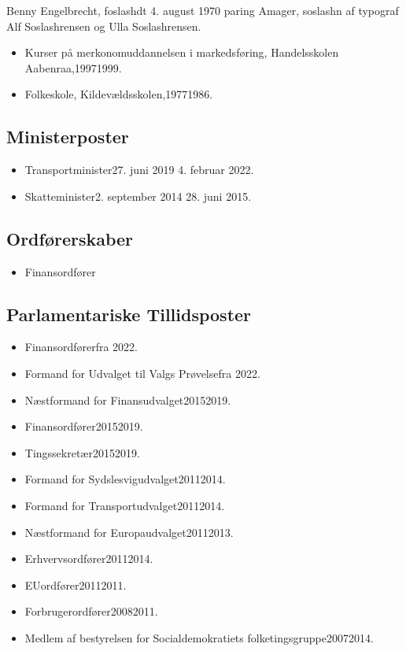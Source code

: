 \documentclass[11pt, a4paper]{awesome-cv}
\begin{document}
\makecvheader[R]
\makelettertitle
\begin{cvletter}
Benny Engelbrecht, foslashdt 4. august 1970 paring Amager, soslashn af typograf Alf Soslashrensen og Ulla Soslashrensen.

\begin{itemize}
\item Kurser på merkonomuddannelsen i markedsføring, Handelsskolen Aabenraa,19971999.
\item Folkeskole, Kildevældsskolen,19771986.
\end{itemize}
\subsection*{Ministerposter}
\begin{itemize}
\item Transportminister27. juni 2019  4. februar 2022.
\item Skatteminister2. september 2014  28. juni 2015.
\end{itemize}
\subsection*{Ordførerskaber}
\begin{itemize}
\item Finansordfører
\end{itemize}
\subsection*{Parlamentariske Tillidsposter}
\begin{itemize}
\item Finansordførerfra 2022.
\item Formand for Udvalget til Valgs Prøvelsefra 2022.
\item Næstformand for Finansudvalget20152019.
\item Finansordfører20152019.
\item Tingssekretær20152019.
\item Formand for Sydslesvigudvalget20112014.
\item Formand for Transportudvalget20112014.
\item Næstformand for Europaudvalget20112013.
\item Erhvervsordfører20112014.
\item EUordfører20112011.
\item Forbrugerordfører20082011.
\item Medlem af bestyrelsen for Socialdemokratiets folketingsgruppe20072014.
\end{itemize}

\end{cvletter}
\end{document}

